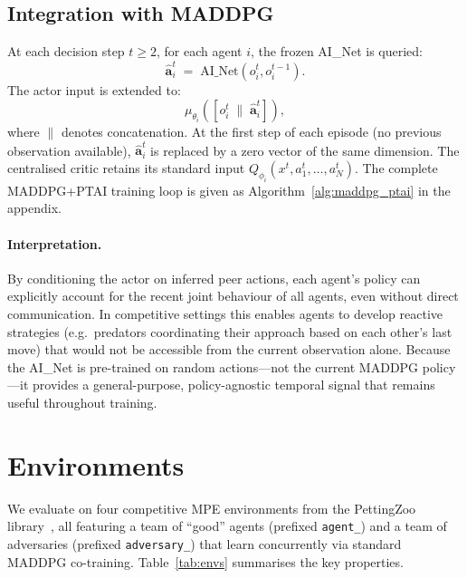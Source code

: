 \documentclass[12pt]{article}
\begin{document}
\subsection{Integration with MADDPG}

At each decision step $t \geq 2$, for each agent $i$, the frozen AI\_Net is queried:
\begin{equation}
\widehat{\mathbf{a}}^t_i \;=\; \text{AI\_Net}(o^t_i, o^{t-1}_i).
\end{equation}
The actor input is extended to:
\begin{equation}
\mu_{\theta_i}\!\left([o^t_i \;\|\; \widehat{\mathbf{a}}^t_i]\right),
\label{eq:actor_ptai}
\end{equation}
where $\|$ denotes concatenation. At the first step of each episode (no previous
observation available), $\widehat{\mathbf{a}}^t_i$ is replaced by a zero vector of the
same dimension. The centralised critic retains its standard input
$Q_{\phi_i}(x^t, a^t_1, \ldots, a^t_N)$. The complete MADDPG+PTAI training loop is
given as Algorithm~\ref{alg:maddpg_ptai} in the appendix.

\paragraph{Interpretation.}
By conditioning the actor on inferred peer actions, each agent's policy can explicitly
account for the recent joint behaviour of all agents, even without direct communication.
In competitive settings this enables agents to develop reactive strategies (e.g.\
predators coordinating their approach based on each other's last move) that would not be
accessible from the current observation alone. Because the AI\_Net is pre-trained on
random actions---not the current MADDPG policy---it provides a general-purpose,
policy-agnostic temporal signal that remains useful throughout training.

\section{Environments}

We evaluate on four competitive MPE environments from the PettingZoo library~\cite{terry2021pettingzoo}, all featuring a team of ``good'' agents (prefixed \texttt{agent\_}) and a team of adversaries (prefixed \texttt{adversary\_}) that learn concurrently via standard MADDPG co-training. Table~\ref{tab:envs} summarises the key properties.
\end{document}
